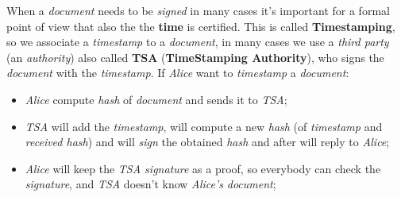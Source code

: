 \documentclass{article}
\begin{document}
When a \emph{document} needs to be \emph{signed} in many cases it's important for a formal point of view that also the the \textbf{time} is certified. This is called \textbf{Timestamping}, so we associate a \emph{timestamp} to a \emph{document}, in many cases we use a \emph{third party} (an \emph{authority}) also called \textbf{TSA} (\textbf{TimeStamping Authority}), who signs the \emph{document} with the \emph{timestamp}. If \emph{Alice} want to \emph{timestamp} a \emph{document}:
\begin{itemize}
\item \emph{Alice} compute \emph{hash} of \emph{document} and sends it to \emph{TSA}; 
\item \emph{TSA} will add the \emph{timestamp}, will compute a new \emph{hash} (of \emph{timestamp} and \emph{received hash}) and will \emph{sign} the obtained \emph{hash} and after will reply to \emph{Alice};
\item \emph{Alice} will keep the \emph{TSA signature} as a proof, so everybody can check the \emph{signature}, and \emph{TSA} doesn't know \emph{Alice's} \emph{document}; 
\end{itemize}
\end{document}
